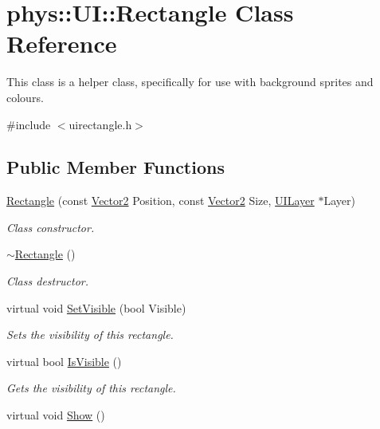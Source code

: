 \hypertarget{classphys_1_1UI_1_1Rectangle}{
\section{phys::UI::Rectangle Class Reference}
\label{d1/d5d/classphys_1_1UI_1_1Rectangle}
}


This class is a helper class, specifically for use with background sprites and colours.  




{\ttfamily \#include $<$uirectangle.h$>$}

\subsection*{Public Member Functions}
\begin{DoxyCompactItemize}
\item 
\hyperlink{classphys_1_1UI_1_1Rectangle_ad28910ef2ccf9fcc15fa4496d4b8456b}{Rectangle} (const \hyperlink{classphys_1_1Vector2}{Vector2} Position, const \hyperlink{classphys_1_1Vector2}{Vector2} Size, \hyperlink{classphys_1_1UILayer}{UILayer} $\ast$Layer)
\begin{DoxyCompactList}\small\item\em Class constructor. \item\end{DoxyCompactList}\item 
\hypertarget{classphys_1_1UI_1_1Rectangle_a8862c7e04c2b8911eac4a2d3b6aff165}{
\hyperlink{classphys_1_1UI_1_1Rectangle_a8862c7e04c2b8911eac4a2d3b6aff165}{$\sim$Rectangle} ()}
\label{d1/d5d/classphys_1_1UI_1_1Rectangle_a8862c7e04c2b8911eac4a2d3b6aff165}

\begin{DoxyCompactList}\small\item\em Class destructor. \item\end{DoxyCompactList}\item 
virtual void \hyperlink{classphys_1_1UI_1_1Rectangle_a4fa5021010e8cdaf9a9e35b3d4c82461}{SetVisible} (bool Visible)
\begin{DoxyCompactList}\small\item\em Sets the visibility of this rectangle. \item\end{DoxyCompactList}\item 
virtual bool \hyperlink{classphys_1_1UI_1_1Rectangle_aad47a2d9a7c9d8d9111b2edbf44541d5}{IsVisible} ()
\begin{DoxyCompactList}\small\item\em Gets the visibility of this rectangle. \item\end{DoxyCompactList}\item 
\hypertarget{classphys_1_1UI_1_1Rectangle_ab408c7607150b24fbc4f70870705a121}{
virtual void \hyperlink{classphys_1_1UI_1_1Rectangle_ab408c7607150b24fbc4f70870705a121}{Show} ()}
\label{d1/d5d/classphys_1_1UI_1_1Rectangle_ab408c7607150b24fbc4f70870705a121}


\end{DoxyCompactItemize}
